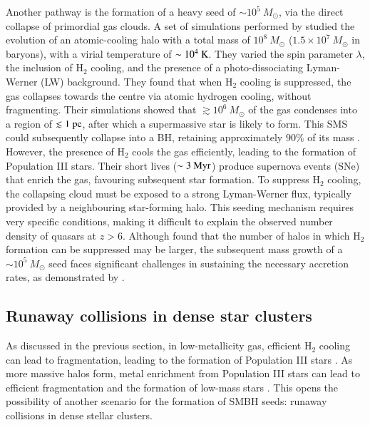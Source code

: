 Another pathway is the formation of a heavy seed of $\sim 10^5~M_{\odot}$, via the direct collapse of primordial gas clouds. A set of simulations performed by \citet{bromm2003formation} studied the evolution of an atomic-cooling halo with a total mass of $10^8~M_{\odot}$ ($1.5\times10^7~M_{\odot}$ in baryons), with a virial temperature of $\sim 10^4~{\rm K}$. They varied the spin parameter $\lambda$, the inclusion of H$_2$ cooling, and the presence of a photo-dissociating Lyman-Werner (LW) background. They found that when H$_2$ cooling is suppressed, the gas collapses towards the centre via atomic hydrogen cooling, without fragmenting. Their simulations showed that $\gtrsim 10^6~M_{\odot}$ of the gas condenses into a region of $\lesssim 1~{\rm pc}$, after which a supermassive star is likely to form. This SMS could subsequently collapse into a BH, retaining approximately $90\%$ of its mass \citep{baumgarte1999evolution,shibata2002collapse}. However, the presence of H$_2$ cools the gas efficiently, leading to the formation of Population III stars. Their short lives ($\sim 3~{\rm Myr}$) produce supernova events (SNe) that enrich the gas, favouring subsequent star formation. To suppress H$_2$ cooling, the collapsing cloud must be exposed to a strong Lyman-Werner flux, typically provided by a neighbouring star-forming halo. This seeding mechanism requires very specific conditions, making it difficult to explain the observed number density of quasars at $z>6$. Although \citet{shang2010supermassive} found that the number of halos in which H$_2$ formation can be suppressed may be larger, the subsequent mass growth of a $\sim 10^5~M_{\odot}$ seed faces significant challenges in sustaining the necessary accretion rates, as demonstrated by \citet{chon2021cosmological}.

\subsection{Runaway collisions in dense star clusters}
\label{sec:Intro_Runaway_coll}

As discussed in the previous section, in low-metallicity gas, efficient H$_2$ cooling can lead to fragmentation, leading to the formation of Population III stars \citep{abel2000formation,liao2019fragmentation}. As more massive halos form, metal enrichment from Population III stars can lead to efficient fragmentation and the formation of low-mass stars \citep{volonteri2010formation,omukai2008can}. This opens the possibility of another scenario for the formation of SMBH seeds: runaway collisions in dense stellar clusters. 

